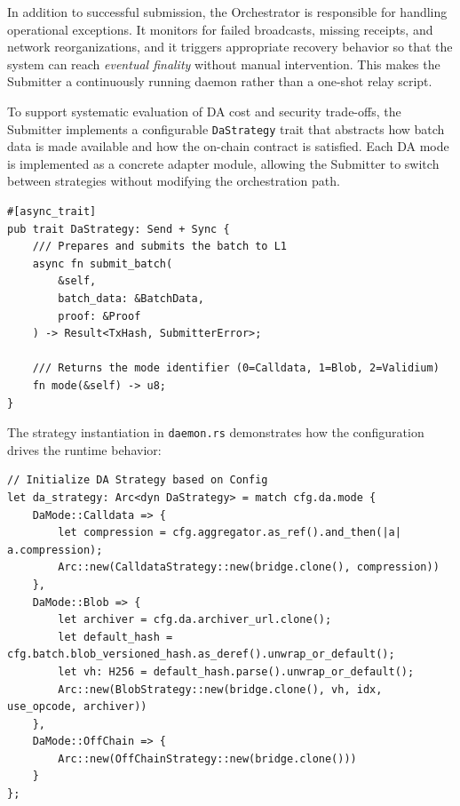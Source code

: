 In addition to successful submission, the Orchestrator is responsible for handling operational exceptions. It monitors for failed broadcasts, missing receipts, and network reorganizations, and it triggers appropriate recovery behavior so that the system can reach \emph{eventual finality} without manual intervention. This makes the Submitter a continuously running daemon rather than a one-shot relay script.


To support systematic evaluation of DA cost and security trade-offs, the Submitter implements a configurable \texttt{DaStrategy} trait that abstracts how batch data is made available and how the on-chain contract is satisfied. Each DA mode is implemented as a concrete adapter module, allowing the Submitter to switch between strategies without modifying the orchestration path.

\begin{lstlisting}[style=rustStyle, caption={The Data Availability Strategy Trait}, label={lst:da-strategy}]
#[async_trait]
pub trait DaStrategy: Send + Sync {
    /// Prepares and submits the batch to L1
    async fn submit_batch(
        &self,
        batch_data: &BatchData,
        proof: &Proof
    ) -> Result<TxHash, SubmitterError>;

    /// Returns the mode identifier (0=Calldata, 1=Blob, 2=Validium)
    fn mode(&self) -> u8;
}
\end{lstlisting}

The strategy instantiation in \texttt{daemon.rs} demonstrates how the configuration drives the runtime behavior:

\begin{lstlisting}[style=rustStyle, caption={Dynamic DA Strategy Selection}, label={lst:da-strategy-selection}]
// Initialize DA Strategy based on Config
let da_strategy: Arc<dyn DaStrategy> = match cfg.da.mode {
    DaMode::Calldata => {
        let compression = cfg.aggregator.as_ref().and_then(|a| a.compression);
        Arc::new(CalldataStrategy::new(bridge.clone(), compression))
    },
    DaMode::Blob => {
        let archiver = cfg.da.archiver_url.clone();
        let default_hash = cfg.batch.blob_versioned_hash.as_deref().unwrap_or_default();
        let vh: H256 = default_hash.parse().unwrap_or_default();
        Arc::new(BlobStrategy::new(bridge.clone(), vh, idx, use_opcode, archiver))
    },
    DaMode::OffChain => {
        Arc::new(OffChainStrategy::new(bridge.clone()))
    }
};
\end{lstlisting}

